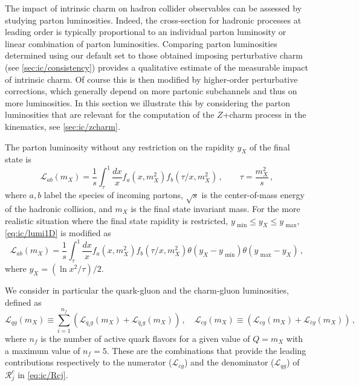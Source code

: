 
The impact of intrinsic charm on hadron collider observables can be
assessed by studying  parton luminosities. Indeed, the
cross-section for hadronic processes at leading order is typically
proportional to an individual parton luminosity or linear combination
of parton luminosities.
%
Comparing parton luminosities determined
using our default \pdf set to those obtained imposing perturbative
charm (see \cref{sec:ic/consistency}) provides a qualitative estimate of the
measurable impact of intrinsic charm. Of course this is then modified
by higher-order
perturbative corrections, which generally depend on more partonic
subchannels and thus on more luminosities.
%
In this section we illustrate this by considering the parton
luminosities that are relevant for the computation of the
$Z$+charm process in the \lhcb kinematics, see \cref{sec:ic/zcharm}.

The parton luminosity without any restriction on the rapidity $y_X$ of the final state is
\begin{equation}
\label{eq:ic/lumi1D}
\mathcal{L}_{ab}(m_X)= \frac{1}{s}\int_{\tau}^1 \frac{dx}{x}f_a \left( x,m_X^2\right)
f_b\left( \tau/x,m_X^2\right) \, ,\qquad
\tau=\frac{m_X^2}{s} \, ,
\end{equation}
where $a,b$ label the species of incoming partons, $\sqrt{s}$ is the center-of-mass energy of
the hadronic collision, and $m_X$ is the final state invariant mass.
%
For the more realistic situation where the final state rapidity
is restricted, $y_\textrm{ min}\le y_X\le y_\textrm{ max}$,
\cref{eq:ic/lumi1D} is modified as
\begin{equation}
\label{eq:ic/lumi1D_restricted}
\mathcal{L}_{ab}(m_X)= \frac{1}{s}\int_{\tau}^1 \frac{dx}{x}f_a \left( x,m_X^2\right)
f_b\left( \tau/x,m_X^2\right) \theta\left( y_X-y_\textrm{ min}  \right)
\theta\left( y_\textrm{ max}-y_X  \right)\, , 
\end{equation}
where $y_X = \left( \ln x^2/\tau \right) /2$.

We consider in particular the quark-gluon and the charm-gluon luminosities, defined as
\begin{equation}
\label{eq:ic/lumis}
\mathcal{L}_{qg}(m_X)\equiv \sum_{i=1}^{n_f} \left( \mathcal{L}_{q_ig}(m_X)+
\mathcal{L}_{\bar{q}_ig}(m_X) \right)\, , \quad
\mathcal{L}_{cg}(m_X)\equiv  \left( \mathcal{L}_{cg}(m_X)+
\mathcal{L}_{\bar{c}g}(m_X) \right)\, , 
\end{equation}
where $n_f$ is the number of active quark flavors for a given value of $Q=m_X$
with a maximum value of $n_f=5$.
%
These are the combinations that provide the leading contributions
respectively to the numerator ($\mathcal{L}_{cg}$) and the 
denominator
($\mathcal{L}_{qg}$) of  $\mathcal{R}_j^c$ in \cref{eq:ic/Rcj}. 

